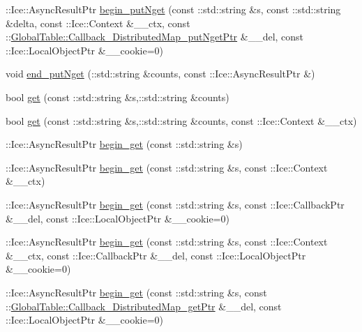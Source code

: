 \begin{DoxyCompactItemize}
\item 
::Ice::AsyncResultPtr \hyperlink{class_ice_proxy_1_1_global_table_1_1_distributed_map_a22f56ad87f754bf496a6b636f604fdba}{begin\_\-putNget} (const ::std::string \&s, const ::std::string \&delta, const ::Ice::Context \&\_\-\_\-ctx, const ::\hyperlink{namespace_global_table_afeefcdd5dfb862806549e834b8727011}{GlobalTable::Callback\_\-DistributedMap\_\-putNgetPtr} \&\_\-\_\-del, const ::Ice::LocalObjectPtr \&\_\-\_\-cookie=0)
\item 
void \hyperlink{class_ice_proxy_1_1_global_table_1_1_distributed_map_a185600a48b9d0bdf47176b27f3b4c87a}{end\_\-putNget} (::std::string \&counts, const ::Ice::AsyncResultPtr \&)
\item 
bool \hyperlink{class_ice_proxy_1_1_global_table_1_1_distributed_map_aef433a6d435244568923a72eb70282f5}{get} (const ::std::string \&s,::std::string \&counts)
\item 
bool \hyperlink{class_ice_proxy_1_1_global_table_1_1_distributed_map_a93c12f567b9d4728088f599772a0b2d7}{get} (const ::std::string \&s,::std::string \&counts, const ::Ice::Context \&\_\-\_\-ctx)
\item 
::Ice::AsyncResultPtr \hyperlink{class_ice_proxy_1_1_global_table_1_1_distributed_map_a806ad7b6fa26ee40c6f4f41f64994946}{begin\_\-get} (const ::std::string \&s)
\item 
::Ice::AsyncResultPtr \hyperlink{class_ice_proxy_1_1_global_table_1_1_distributed_map_accd5528317383e4165bbf3c27a65d074}{begin\_\-get} (const ::std::string \&s, const ::Ice::Context \&\_\-\_\-ctx)
\item 
::Ice::AsyncResultPtr \hyperlink{class_ice_proxy_1_1_global_table_1_1_distributed_map_ab430604b326a6a62a26b099580888a9d}{begin\_\-get} (const ::std::string \&s, const ::Ice::CallbackPtr \&\_\-\_\-del, const ::Ice::LocalObjectPtr \&\_\-\_\-cookie=0)
\item 
::Ice::AsyncResultPtr \hyperlink{class_ice_proxy_1_1_global_table_1_1_distributed_map_a3f6b6e7aea12069b148799d36ef93e3a}{begin\_\-get} (const ::std::string \&s, const ::Ice::Context \&\_\-\_\-ctx, const ::Ice::CallbackPtr \&\_\-\_\-del, const ::Ice::LocalObjectPtr \&\_\-\_\-cookie=0)
\item 
::Ice::AsyncResultPtr \hyperlink{class_ice_proxy_1_1_global_table_1_1_distributed_map_ae3678bd85d9c6ca40020ff158f7dbb4b}{begin\_\-get} (const ::std::string \&s, const ::\hyperlink{namespace_global_table_a9ad421b8bc43ec4b2173407f2bed7ecc}{GlobalTable::Callback\_\-DistributedMap\_\-getPtr} \&\_\-\_\-del, const ::Ice::LocalObjectPtr \&\_\-\_\-cookie=0)

\end{DoxyCompactItemize}
